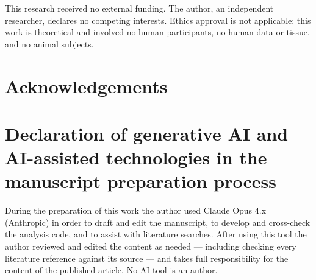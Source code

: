 \documentclass[preprint,12pt]{elsarticle}
\begin{document}
This research received no external funding. The author, an independent
researcher, declares no competing interests. Ethics approval is not
applicable: this work is theoretical and involved no human participants,
no human data or tissue, and no animal subjects.

\section*{Acknowledgements}\label{acknowledgements}

\section{Declaration of generative AI and AI-assisted technologies in
the manuscript preparation
process}\label{declaration-of-generative-ai-and-ai-assisted-technologies-in-the-manuscript-preparation-process}

During the preparation of this work the author used Claude Opus 4.x
(Anthropic) in order to draft and edit the manuscript, to develop and
cross-check the analysis code, and to assist with literature searches.
After using this tool the author reviewed and edited the content as
needed --- including checking every literature reference against its
source --- and takes full responsibility for the content of the
published article. No AI tool is an author.



\end{document}
